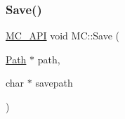 \mbox{\label{namespace_m_c_a8107d411ea943330c775a454b26f701b}} 
\subsubsection{\texorpdfstring{Save()}{Save()}}
{\footnotesize\ttfamily \mbox{\hyperlink{_mesh___creator___controller_8hpp_a529916b90fdb2765a7b955fded854b0a}{M\+C\+\_\+\+A\+PI}} void M\+C\+::\+Save (\begin{DoxyParamCaption}\item[{\mbox{\hyperlink{class_m_c_1_1_path}{Path}} $\ast$}]{path,  }\item[{char $\ast$}]{savepath }\end{DoxyParamCaption})}


